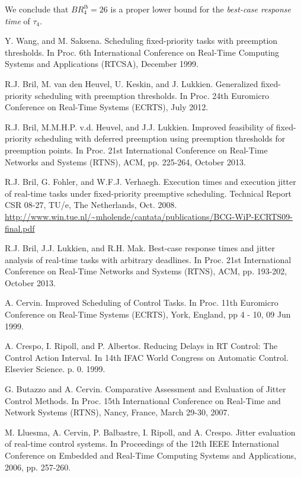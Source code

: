 \documentclass[fleqn]{article}
\begin{document}
We conclude that  $BR^{lb}_4 = 26$ is a proper lower bound for the \textit{best-case response time} of $\tau_4$.

\begin{thebibliography}{10}
	
	Y. Wang, and M. Saksena.
	Scheduling fixed-priority tasks with preemption thresholds.
	In Proc. 6th International Conference on Real-Time Computing Systems and Applications (RTCSA), December 1999.	
	
	R.J. Bril, M. van den Heuvel, U. Keskin, and J. Lukkien.
	Generalized fixed-priority scheduling with preemption thresholds.
	In Proc. 24th Euromicro Conference on Real-Time Systems (ECRTS), July 2012.
	
	R.J. Bril, M.M.H.P. v.d. Heuvel, and J.J. Lukkien.
	Improved feasibility of fixed-priority scheduling with deferred preemption using preemption thresholds for preemption points.
	In Proc. 21st International Conference on Real-Time Networks and Systems (RTNS), ACM, pp. 225-264, October 2013.
	
	R.J. Bril, G. Fohler, and W.F.J. Verhaegh. 
	Execution times and execution jitter of real-time tasks under fixed-priority preemptive scheduling. 
	Technical Report CSR 08-27, TU/e, The Netherlands, Oct. 2008. \url{http://www.win.tue.nl/~mholende/cantata/publications/BCG-WiP-ECRTS09-final.pdf}
	
	R.J. Bril, J.J. Lukkien, and R.H. Mak.
	Best-case response times and jitter analysis of real-time tasks with arbitrary deadlines.
	In Proc. 21st International Conference on Real-Time Networks and Systems (RTNS), ACM, pp. 193-202, October 2013.
	
	A. Cervin. 
	Improved Scheduling of Control Tasks.
	In Proc. 11th Euromicro Conference on Real-Time Systems (ECRTS), York, England, pp 4 - 10, 09 Jun 1999. 
	
	A. Crespo, I. Ripoll, and P. Albertos. 
	Reducing Delays in RT Control: The Control Action Interval. 
	In 14th IFAC World Congress on Automatic Control. Elsevier Science. p. 0. 1999.
	
	G. Butazzo and A. Cervin. 
	Comparative Assessment and Evaluation of Jitter Control Methods. 
	In Proc. 15th International Conference on Real-Time and Network Systems (RTNS), Nancy, France, March 29-30, 2007.
	
	M. Lluesma, A. Cervin, P. Balbastre, I. Ripoll, and A. Crespo.
	Jitter evaluation of real-time control systems.
	In Proceedings of the 12th IEEE International Conference on Embedded and Real-Time Computing Systems and Applications, 2006, pp. 257-260.
	

\end{thebibliography}
\end{document}

